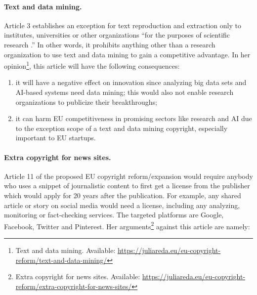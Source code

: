 \documentclass[a4paper]{article}
\begin{document}
\paragraph{Text and data mining.} 
Article 3 establishes an exception for text reproduction and extraction only to institutes, universities or other organizations ``for the purposes of scientific research \cite{Copyright Reform}.'' In other words, it prohibits anything other than a research organization to use text and data mining to gain a competitive advantage. In her opinion\footnote{Text and data mining. Available: \url{https://juliareda.eu/eu-copyright-reform/text-and-data-mining/}}, this article will have the following consequences:
\begin{enumerate}
\item it will have a negative effect on innovation since analyzing big data sets and AI-based systems need data mining; this would also not enable research organizations to publicize their breakthroughs;
\item it can harm EU competitiveness in promising sectors like research and AI due to the exception scope of a text and data mining copyright, especially important to EU startups.
\end{enumerate}

\paragraph{Extra copyright for news sites.}
Article 11 of the proposed EU copyright reform/expansion would require anybody who uses a snippet of journalistic content to first get a license from the publisher which would apply for 20 years after the publication. For example, any shared article or story on social media would need a license, including any analyzing, monitoring or fact-checking services. The targeted platforms are Google, Facebook, Twitter and Pinterest. Her arguments\footnote{Extra copyright for news sites. Available: \url{https://juliareda.eu/eu-copyright-reform/extra-copyright-for-news-sites/}} against this article are namely:
\end{document}
